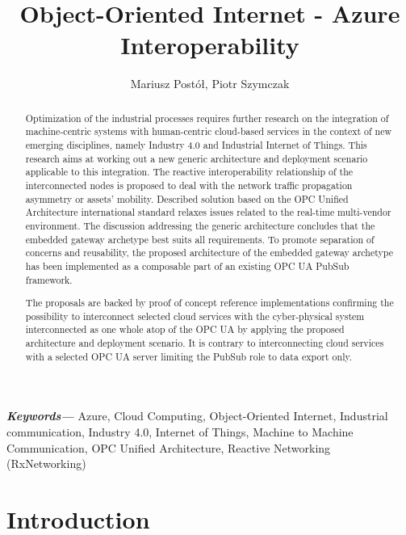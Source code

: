 \documentclass{article}
\title{Object-Oriented Internet - Azure Interoperability}
\author[1]{Mariusz Postół, Piotr Szymczak}
\affil[1]
{
 Lodz University of Technology\\
 Institute of Information Technology\\
 ul. Wólczańska 215, 90-924 Lodz, Poland\\
 mailto:mariusz.postol@p.lodz.pl
}
\date{}
\providecommand{\keywords}[1]{ \small \textbf{\textit{Keywords---}} #1 }
\begin{document}
\maketitle

\begin{abstract}

      Optimization of the industrial processes requires further research on the integration of machine-centric systems with human-centric cloud-based services in the context of new emerging disciplines, namely Industry 4.0 and Industrial Internet of Things. This research aims at working out a new generic architecture and deployment scenario applicable to this integration. The reactive interoperability relationship of the interconnected nodes is proposed to deal with the network traffic propagation asymmetry or assets' mobility. Described solution based on the OPC Unified Architecture international standard relaxes issues related to the real-time multi-vendor environment. The discussion addressing the generic architecture concludes that the embedded gateway archetype best suits all requirements. To promote separation of concerns and reusability, the proposed architecture of the embedded gateway archetype has been implemented as a composable part of an existing OPC UA PubSub framework.

      The proposals are backed by proof of concept reference implementations confirming the possibility to interconnect selected cloud services with the cyber-physical system interconnected as one whole atop of the OPC UA by applying the proposed architecture and deployment scenario. It is contrary to interconnecting cloud services with a selected OPC UA server limiting the PubSub role to data export only.

\end{abstract}

\keywords{ Azure, Cloud Computing, Object-Oriented Internet, Industrial communication, Industry 4.0, Internet of Things, Machine to Machine Communication, OPC Unified Architecture,
Reactive Networking (RxNetworking)  }

\maketitle


\section{Introduction}\label{introduction}
\end{document}
